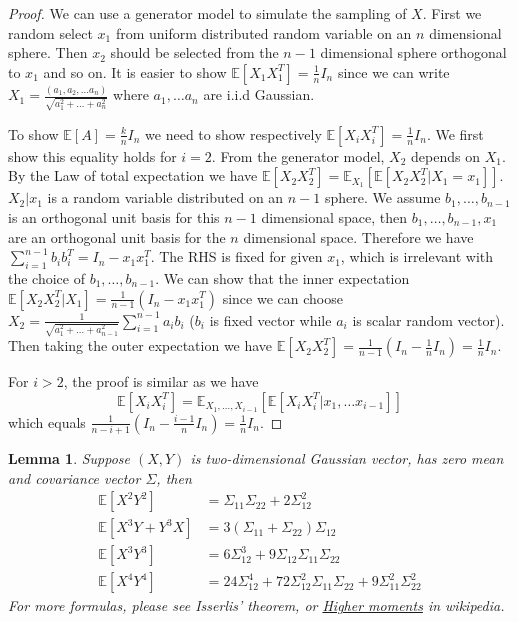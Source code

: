\documentclass{article}
\def\E{\mathbb{E}}
\newtheorem{lemma}{Lemma}
\begin{document}
\begin{proof}
We can use a generator model to simulate the sampling of $X$. First we random select $x_1$ from uniform distributed random variable on an $n$ dimensional sphere. Then $x_2$ should be selected from the $n-1$ dimensional sphere orthogonal to $x_1$ and so on.
It is easier to show $\E[X_1X_1^T] = \frac{1}{n} I_n$ since we can write $X_1 = \frac{(a_1, a_2, \dots a_n) }{\sqrt{a_1^2+\dots + a_n^2}}$ where $a_1, \dots a_n$ are i.i.d Gaussian.

To show $\E[A]=\frac{k}{n}I_n$ we need to show respectively $\E[X_iX_i^T]=\frac{1}{n} I_n$. We first show this equality holds for $i=2$. From the generator model, $X_2$ depends on $X_1$. By the Law of total expectation we have $\E[X_2 X_2^T] = \E_{X_1}[\E[X_2 X_2^T |X_1 = x_1]]$. $X_2 | x_1$ is a random variable distributed on an $n-1$ sphere. We assume $b_1, \dots, b_{n-1}$ is an orthogonal unit basis for this $n-1$ dimensional space,
then $b_1, \dots, b_{n-1}, x_1$ are an orthogonal unit basis for the $n$ dimensional space. Therefore we have
$\sum_{i=1}^{n-1} b_i b_i^T = I_n -  x_1 x_1^T $. The RHS is fixed for given $x_1$, which is irrelevant with the choice of $b_1, \dots, b_{n-1}$. We can show that the inner expectation $\E[X_2 X_2^T |X_1] = \frac{1}{n-1}(I_n - x_1 x_1^T)$ since we can choose $X_2 = \frac{1}{\sqrt{a_1^2 + \dots + a_{n-1}^2}} \sum_{i=1}^{n-1} a_i b_i$ ($b_i$ is fixed vector while $a_i$ is scalar random vector). Then taking the outer expectation we have $\E[X_2 X_2^T] = \frac{1}{n-1} (I_n - \frac{1}{n} I_n) = \frac{1}{n} I_n$.

For $i>2$, the proof is similar as we have $$
\E[X_i X_i^T] = \E_{X_1, \dots, X_{i-1}} [\E[X_i X_i^T | x_1, \dots x_{i-1}]]
$$
 which equals $\frac{1}{n-i+1}(I_n - \frac{i-1}{n} I_n) = \frac{1}{n} I_n$.
\end{proof}
\begin{lemma}\label{lem:x2y2}
Suppose $(X,Y)$ is two-dimensional Gaussian vector, has zero mean and covariance vector $\Sigma$, then 
\begin{align*}
\E[X^2 Y^2] &= \Sigma_{11}\Sigma_{22} + 2\Sigma_{12}^2 \\
\E[X^3 Y + Y^3 X ] &= 3 (\Sigma_{11} + \Sigma_{22}) \Sigma_{12} \\
\E[X^3 Y^3] & = 6 \Sigma_{12}^3 + 9 \Sigma_{12} \Sigma_{11} \Sigma_{22}\\
\E[X^4 Y^4] & = 24 \Sigma_{12}^4 + 72 \Sigma_{12}^2 \Sigma_{11} \Sigma_{22} + 9\Sigma_{11}^2 \Sigma_{22}^2 
\end{align*}
For more formulas, please see Isserlis' theorem, or \href{https://en.wikipedia.org/wiki/Multivariate_normal_distribution#Higher_moments}{Higher moments} in wikipedia.
\end{lemma}
\end{document}
